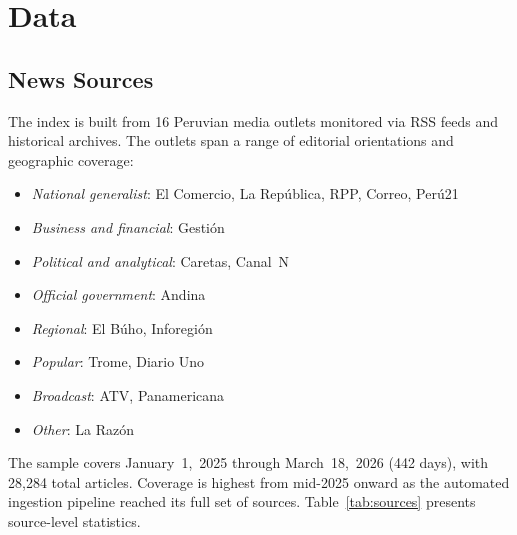 \documentclass[12pt,a4paper]{article}
\begin{document}
\section{Data}
\label{sec:data}

\subsection{News Sources}
\label{subsec:sources}

The index is built from 16 Peruvian media outlets monitored via RSS feeds
and historical archives.  The outlets span a range of editorial orientations
and geographic coverage:

\begin{itemize}
  \item \emph{National generalist}: El Comercio, La Rep\'ublica, RPP,
        Correo, Per\'u21
  \item \emph{Business and financial}: Gesti\'on
  \item \emph{Political and analytical}: Caretas, Canal~N
  \item \emph{Official government}: Andina
  \item \emph{Regional}: El B\'uho, Inforegi\'on
  \item \emph{Popular}: Trome, Diario Uno
  \item \emph{Broadcast}: ATV, Panamericana
  \item \emph{Other}: La Raz\'on
\end{itemize}

The sample covers January~1,~2025 through March~18,~2026 (442 days), with
28,284 total articles. Coverage is highest from mid-2025 onward as the
automated ingestion pipeline reached its full set of sources.
Table~\ref{tab:sources} presents source-level statistics.
\end{document}
